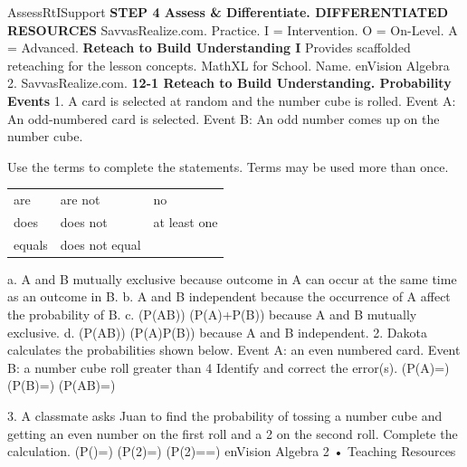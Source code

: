\documentclass{article}
\newenvironment{te-addendum}[2]{}{}     %
\newcommand{\answer}[1]{}               %
\newcommand{\placeholder}[2]{}          %
\begin{document}
\begin{te-addendum}{Assess}{RtISupport}
\textbf{STEP 4 Assess \& Differentiate. DIFFERENTIATED RESOURCES}
SavvasRealize.com. Practice. I = Intervention. O = On-Level. A = Advanced.
\textbf{Reteach to Build Understanding I}
Provides scaffolded reteaching for the lesson concepts. MathXL for School.
Name. enVision Algebra 2. SavvasRealize.com.
\textbf{12-1 Reteach to Build Understanding. Probability Events}
1. A card is selected at random and the number cube is rolled.
Event A: An odd-numbered card is selected.
Event B: An odd number comes up on the number cube.
\placeholder{diagram}{Five fanned cards numbered 1, 2, 3, 4, 5; gray cube with 2 top, 3 front, 6 right.}
Use the terms to complete the statements. Terms may be used more than once.
\begin{tabular}{lll}
are & are not & no \\
does & does not & at least one \\
equals & does not equal & \\
\end{tabular}
a. A and B \answer{are not} mutually exclusive because \answer{at least one} outcome in A can occur at the same time as an outcome in B.
b. A and B \answer{are} independent because the occurrence of A \answer{does not} affect the probability of B.
c. (P(AB)) \answer{does not equal} (P(A)+P(B)) because A and B \answer{are not} mutually exclusive.
d. (P(AB)) \answer{equals} (P(A)\cdot P(B)) because A and B \answer{are} independent.
2. Dakota calculates the probabilities shown below.
Event A: an even numbered card. Event B: a number cube roll greater than 4
Identify and correct the error(s).
(P(A)=)
(P(B)=)
(P(AB)=)
\answer{Dakota added the probabilities instead of multiplying: (\frac{2}{5}\cdot\frac{2}{6}=\frac{2}{15}).}
3. A classmate asks Juan to find the probability of tossing a number cube and getting an even number on the first roll and a 2 on the second roll. Complete the calculation.
(P()=)
(P(2)=\frac{\answer{1}}{6})
(P(2)=\frac{1}{\answer{2}}\cdot\frac{\answer{1}}{6}=\answer{\frac{1}{12}})
enVision Algebra 2 • Teaching Resources
\end{te-addendum}
\end{document}
